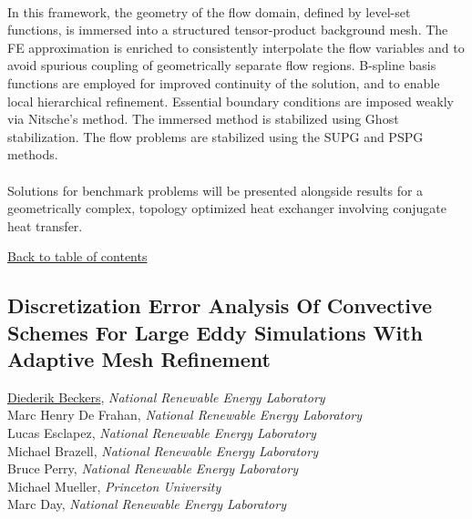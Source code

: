 \noindent   \\ 
\noindent In this framework, the geometry of the flow domain, defined by level-set functions, is immersed into a structured tensor-product background mesh. The FE approximation is enriched to consistently interpolate the flow variables and to avoid spurious coupling of geometrically separate flow regions. B-spline basis functions are employed for improved continuity of the solution, and to enable local hierarchical refinement. Essential boundary conditions are imposed weakly via Nitsche’s method. The immersed method is stabilized using Ghost stabilization. The flow problems are stabilized using the SUPG and PSPG methods. \\ 
\noindent  \\ 
\noindent Solutions for benchmark problems will be presented alongside results for a geometrically complex, topology optimized heat exchanger involving conjugate heat transfer. \\ 
\begin{flushright}\vspace{-0.2 in}\hyperlink{toc}{Back to table of contents}\end{flushright}\vspace{-0.2 in}
\hypertarget{DiederikBeckers}{\subsection*{\color{CUGOLD} Discretization Error Analysis Of Convective Schemes For Large Eddy Simulations With Adaptive Mesh Refinement}} \vsp 
\underline{Diederik Beckers}, \textit{National Renewable Energy Laboratory}\\ 
{Marc Henry De Frahan}, \textit{National Renewable Energy Laboratory}\\ 
{Lucas Esclapez}, \textit{National Renewable Energy Laboratory}\\ 
{Michael Brazell}, \textit{National Renewable Energy Laboratory}\\ 
{Bruce Perry}, \textit{National Renewable Energy Laboratory}\\ 
{Michael Mueller}, \textit{Princeton University}\\ 
{Marc Day}, \textit{National Renewable Energy Laboratory}\\ 
\vspace{-0.1 in} \\ 
